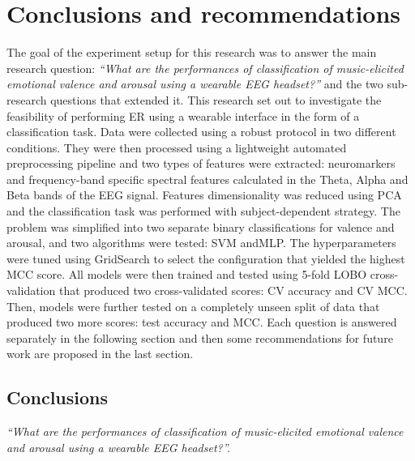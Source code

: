 \chapter{Conclusions and recommendations}
\label{chap:conclusions}
The goal of the experiment setup for this research was to answer the main research question: \emph{“What are the performances of classification of music-elicited emotional valence and arousal using a wearable EEG headset?”} and the two sub-research questions that extended it. This research set out to investigate the feasibility of performing \ac{ER} using a wearable interface in the form of a classification task. Data were collected using a robust protocol in two different conditions. They were then processed using a lightweight automated preprocessing pipeline and two types of features were extracted: neuromarkers and frequency-band specific spectral features calculated in the Theta, Alpha and Beta bands of the \ac{EEG} signal. Features dimensionality was reduced using \ac{PCA} and the classification task was performed with subject-dependent strategy. The problem was simplified into two separate binary classifications for valence and arousal, and two algorithms were tested: \ac{SVM} and\ac{MLP}. The hyperparameters were tuned using GridSearch to select the configuration that yielded the highest \ac{MCC} score. All models were then trained and tested using 5-fold \ac{LOBO} cross-validation that produced two cross-validated scores: \ac{CV} accuracy and \ac{CV MCC}. Then, models were further tested on a completely unseen split of data that produced two more scores: test accuracy and \ac{MCC}. Each question is answered separately in the following section and then some recommendations for future work are proposed in the last section.
\section{Conclusions}
\emph{“What are the performances of classification of music-elicited emotional valence and arousal using a wearable EEG headset?”. }

